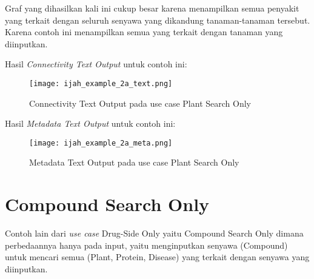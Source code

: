Graf yang dihasilkan kali ini cukup besar karena menampilkan semua penyakit yang terkait dengan seluruh senyawa yang dikandung tanaman-tanaman tersebut. Karena contoh ini menampilkan semua yang terkait dengan tanaman yang diinputkan.

Hasil \emph{Connectivity Text Output} untuk contoh ini:

\begin{figure}[H]
	\centering
	\texttt{[image: ijah\_example\_2a\_text.png]}
	\caption{Connectivity Text Output pada use case Plant Search Only}
	\label{fig:ijah_example_2a_text}
\end{figure}

Hasil \emph{Metadata Text Output} untuk contoh ini:

\begin{figure}[H]
	\centering
	\texttt{[image: ijah\_example\_2a\_meta.png]}
	\caption{Metadata Text Output pada use case Plant Search Only}
	\label{fig:ijah_example_2a_meta}
\end{figure}

\section{Compound Search Only}
Contoh lain dari \emph{use case} Drug-Side Only yaitu Compound Search Only dimana perbedaannya hanya pada input, yaitu menginputkan senyawa (Compound) untuk mencari semua (Plant, Protein, Disease) yang terkait dengan senyawa yang diinputkan.

